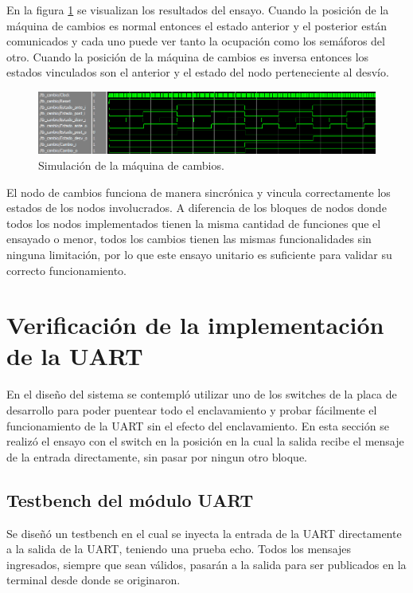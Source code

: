 		En la figura \ref{fig:Test_Cambios} se visualizan los resultados del ensayo. Cuando la posición de la máquina de cambios es normal entonces el estado anterior y el posterior están comunicados y cada uno puede ver tanto la ocupación como los semáforos del otro. Cuando la posición de la máquina de cambios es inversa entonces los estados vinculados son el anterior y el estado del nodo perteneciente al desvío.
		
		\begin{figure}[h]
		\centering
		\includegraphics[scale=0.55]{./Figures/Test/Cambio}
			\caption{Simulación de la máquina de cambios.}
			\label{fig:Test_Cambios}
		\end{figure}
			
		El nodo de cambios funciona de manera sincrónica y vincula correctamente los estados de los nodos involucrados. A diferencia de los bloques de nodos donde todos los nodos implementados tienen la misma cantidad de funciones que el ensayado o menor, todos los cambios tienen las mismas funcionalidades sin ninguna limitación, por lo que este ensayo unitario es suficiente para validar su correcto funcionamiento.
				
\section{Verificación de la implementación de la UART}

	En el diseño del sistema se contempló utilizar uno de los switches de la placa de desarrollo para poder puentear todo el enclavamiento y probar fácilmente el funcionamiento de la UART sin el efecto del enclavamiento. En esta sección se realizó el ensayo con el switch en la posición en la cual la salida recibe el mensaje de la entrada directamente, sin pasar por ningun otro bloque.

	\subsection{Testbench del módulo UART}
			
		Se diseñó un testbench en el cual se inyecta la entrada de la UART directamente a la salida de la UART, teniendo una prueba echo. Todos los mensajes ingresados, siempre que sean válidos, pasarán a la salida para ser publicados en la terminal desde donde se originaron.
						
